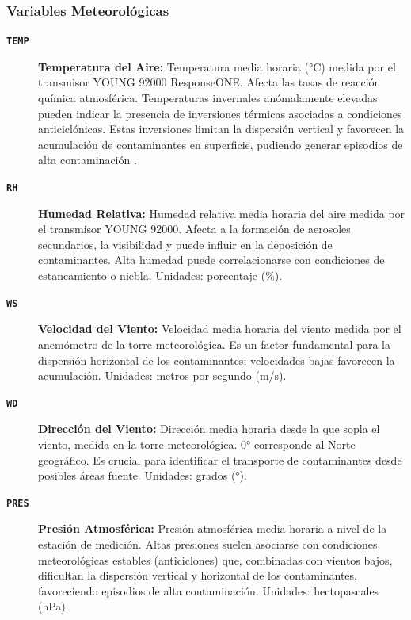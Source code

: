 \subsubsection*{Variables Meteorológicas}
\begin{description}
    \item[\textbf{\texttt{TEMP}}] \textbf{Temperatura del Aire:} Temperatura media horaria (°C) medida por el transmisor YOUNG 92000 ResponseONE. Afecta las tasas de reacción química atmosférica. Temperaturas invernales anómalamente elevadas pueden indicar la presencia de inversiones térmicas asociadas a condiciones anticiclónicas. Estas inversiones limitan la dispersión vertical y favorecen la acumulación de contaminantes en superficie, pudiendo generar episodios de alta contaminación \citep{Wallace2006atmospheric, Seinfeld2016atmospheric}.

    \item[\textbf{\texttt{RH}}] \textbf{Humedad Relativa:} Humedad relativa media horaria del aire medida por el transmisor YOUNG 92000. Afecta a la formación de aerosoles secundarios, la visibilidad y puede influir en la deposición de contaminantes. Alta humedad puede correlacionarse con condiciones de estancamiento o niebla. Unidades: porcentaje (\%).

    \item[\textbf{\texttt{WS}}] \textbf{Velocidad del Viento:} Velocidad media horaria del viento medida por el anemómetro de la torre meteorológica. Es un factor fundamental para la dispersión horizontal de los contaminantes; velocidades bajas favorecen la acumulación. Unidades: metros por segundo (m/s).

    \item[\textbf{\texttt{WD}}] \textbf{Dirección del Viento:} Dirección media horaria desde la que sopla el viento, medida en la torre meteorológica. 0° corresponde al Norte geográfico. Es crucial para identificar el transporte de contaminantes desde posibles áreas fuente. Unidades: grados (°).

    \item[\textbf{\texttt{PRES}}] \textbf{Presión Atmosférica:} Presión atmosférica media horaria a nivel de la estación de medición. Altas presiones suelen asociarse con condiciones meteorológicas estables (anticiclones) que, combinadas con vientos bajos, dificultan la dispersión vertical y horizontal de los contaminantes, favoreciendo episodios de alta contaminación. Unidades: hectopascales (hPa).
\end{description}


